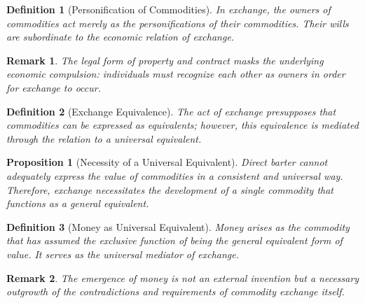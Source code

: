 \documentclass{article}
\newtheorem{innerdef}{Definition}
\newtheorem{innerprop}{Proposition}
\newtheorem{innerremark}{Remark}
\newenvironment{definition}{\begin{innerdef}}{\end{innerdef}}
\newenvironment{proposition}{\begin{innerprop}}{\end{innerprop}}
\newenvironment{remark}{\begin{innerremark}}{\end{innerremark}}
\begin{document}
\begin{definition}[Personification of Commodities]
In exchange, the owners of commodities act merely as the personifications 
of their commodities. Their wills are subordinate to the economic 
relation of exchange.
\end{definition}

\begin{remark}
The legal form of property and contract masks the underlying 
economic compulsion: individuals must recognize each other as 
owners in order for exchange to occur.
\end{remark}

\begin{definition}[Exchange Equivalence]
The act of exchange presupposes that commodities can be 
expressed as equivalents; however, this equivalence is mediated 
through the relation to a universal equivalent.
\end{definition}

\begin{proposition}[Necessity of a Universal Equivalent]
Direct barter cannot adequately express the value of commodities 
in a consistent and universal way. Therefore, exchange 
necessitates the development of a single commodity that 
functions as a general equivalent.
\end{proposition}

\begin{definition}[Money as Universal Equivalent]
Money arises as the commodity that has assumed the exclusive 
function of being the general equivalent form of value. 
It serves as the universal mediator of exchange.
\end{definition}

\begin{remark}
The emergence of money is not an external invention but a 
necessary outgrowth of the contradictions and requirements 
of commodity exchange itself.
\end{remark}
\end{document}
